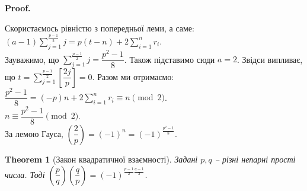 \documentclass[a4paper, 10pt]{article}
\makeatletter
\theoremstyle{theoremdd}
\newtheorem{theorem}{Theorem}[subsection]
\theoremstyle{theoremdd}
\theoremstyle{theoremdd}
\theoremstyle{theoremdd}
\theoremstyle{theoremdd}
\theoremstyle{theoremdd}
\theoremstyle{theoremdd}
\theoremstyle{theoremdd}
\renewenvironment{proof}[1][Proof.\\]{\par
\pushQED{\hfill \qed}%
\normalfont \topsep6\p@\@plus6\p@\relax
\trivlist
\item\relax
{\bfseries
#1\@addpunct{.}}\hspace\labelsep\ignorespaces
}{%
\popQED\endtrivlist\@endpefalse
}
\makeatother
\begin{document}
\begin{proof}
Скористаємось рівністю з попередньої леми, а саме:\\
$\displaystyle (a-1)\sum_{j=1}^{\frac{p-1}{2}}j = p(t-n)+2 \sum_{i=1}^n r_i$.\\
Зауважимо, що $\displaystyle\sum_{j=1}^{\frac{p-1}{2}} j = \dfrac{p^2-1}{8}$. Також підставимо сюди $a = 2$. Звідси випливає, що $t = \displaystyle\sum_{j=1}^{\frac{p-1}{2}} \left[ \dfrac{2j}{p} \right] = 0$. Разом ми отримаємо:\\
$\dfrac{p^2-1}{8} = (-p)n + 2 \displaystyle\sum_{i=1}^n r_i \equiv n \pmod 2$.\\
$n \equiv \dfrac{p^2-1}{8} \pmod 2$.\\
За лемою Гауса, $\left( \dfrac{2}{p} \right) = (-1)^n = (-1)^{\textstyle\frac{p^2-1}{8}} $.
\end{proof}

\begin{theorem}[Закон квадратичної взаємності]
Задані $p,q$ -- різні непарні прості числа. Тоді $\left( \dfrac{p}{q} \right) \left( \dfrac{q}{p} \right) = (-1)^{\textstyle\frac{p-1}{2} \frac{q-1}{2}}$.
\end{theorem}
\end{document}
